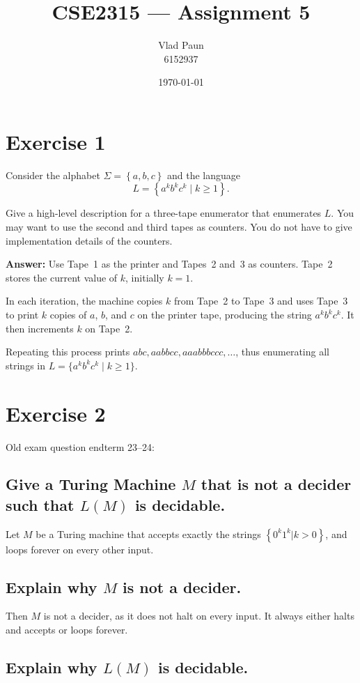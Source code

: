 \documentclass[a4paper,11pt]{article}
\title{\textbf{CSE2315 --- Assignment 5}}
\author{Vlad Paun \\ 6152937}
\date{\today}
\newcommand{\Alphabet}{\Sigma}
\newcommand{\set}[1]{\left\{ #1 \right\}}
\begin{document}
	\maketitle

	\section{Exercise 1}
	Consider the alphabet $\Alphabet = \set{a,b,c}$ and the language
	\[
	L = \set{a^k b^k c^k \mid k \geq 1}.
	\]

	Give a high-level description for a three-tape enumerator that enumerates $L$. You may want to use the second and third tapes as counters. You do not have to give implementation details of the counters.


	\textbf{Answer: }Use Tape~1 as the printer and Tapes~2 and~3 as counters.
	Tape~2 stores the current value of $k$, initially $k=1$.

	In each iteration, the machine copies $k$ from Tape~2 to Tape~3 and uses
	Tape~3 to print $k$ copies of $a$, $b$, and $c$ on the printer tape,
	producing the string $a^k b^k c^k$. It then increments $k$ on Tape~2.

	Repeating this process prints $abc, aabbcc, aaabbbccc, \dots$, thus
	enumerating all strings in $L = \{a^k b^k c^k \mid k \ge 1\}$.



	\section{Exercise 2}
	Old exam question endterm 23--24:

	\subsection{Give a Turing Machine $M$ that is not a decider such that $L(M)$ is decidable.}

	Let $M$ be a Turing machine that accepts exactly the strings $\set{0^k1^k | k>0}$, and loops forever on every other input.

	\subsection{Explain why $M$ is not a decider.}

	Then $M$ is not a decider, as it does not halt on every input. It always either halts and accepts or loops forever.

	\subsection{Explain why $L(M)$ is decidable.}
\end{document}
